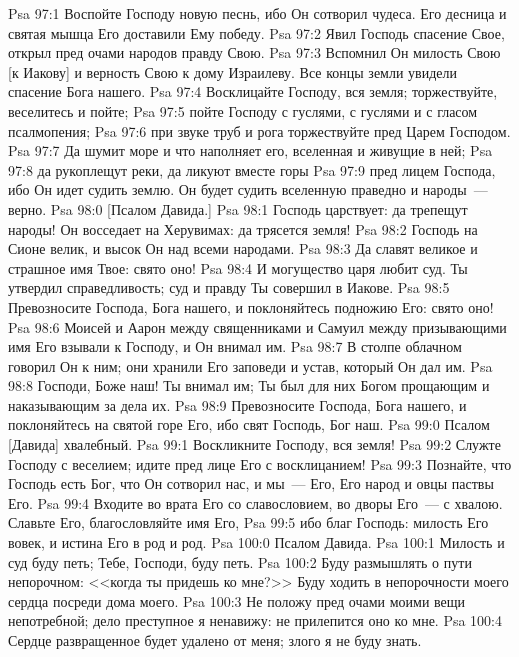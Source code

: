 \rsbpar\vs Psa 97:1 Воспойте Господу новую песнь, ибо Он сотворил чудеса. Его десница и святая мышца Его доставили Ему победу.
\vs Psa 97:2 Явил Господь спасение Свое, открыл пред очами народов правду Свою.
\vs Psa 97:3 Вспомнил Он милость Свою [к Иакову] и верность Свою к дому Израилеву. Все концы земли увидели спасение Бога нашего.
\vs Psa 97:4 Восклицайте Господу, вся земля; торжествуйте, веселитесь и пойте;
\vs Psa 97:5 пойте Господу с гуслями, с гуслями и с гласом псалмопения;
\vs Psa 97:6 при звуке труб и рога торжествуйте пред Царем Господом.
\vs Psa 97:7 Да шумит море и что наполняет его, вселенная и живущие в ней;
\vs Psa 97:8 да рукоплещут реки, да ликуют вместе горы
\vs Psa 97:9 пред лицем Господа, ибо Он идет судить землю. Он будет судить вселенную праведно и народы~--- верно.
\vs Psa 98:0 [Псалом Давида.]
\rsbpar\vs Psa 98:1 Господь царствует: да трепещут народы! Он восседает на Херувимах: да трясется земля!
\vs Psa 98:2 Господь на Сионе велик, и высок Он над всеми народами.
\vs Psa 98:3 Да славят великое и страшное имя Твое: свято оно!
\vs Psa 98:4 И могущество царя любит суд. Ты утвердил справедливость; суд и правду Ты совершил в Иакове.
\vs Psa 98:5 Превозносите Господа, Бога нашего, и поклоняйтесь подножию Его: свято оно!
\vs Psa 98:6 Моисей и Аарон между священниками и Самуил между призывающими имя Его взывали к Господу, и Он внимал им.
\vs Psa 98:7 В столпе облачном говорил Он к ним; они хранили Его заповеди и устав, который Он дал им.
\vs Psa 98:8 Господи, Боже наш! Ты внимал им; Ты был для них Богом прощающим и наказывающим за дела их.
\vs Psa 98:9 Превозносите Господа, Бога нашего, и поклоняйтесь на святой горе Его, ибо свят Господь, Бог наш.
\vs Psa 99:0 Псалом [Давида] хвалебный.
\rsbpar\vs Psa 99:1 Воскликните Господу, вся земля!
\vs Psa 99:2 Слу\-ж\-те Господу с веселием; идите пред лице Его с восклицанием!
\vs Psa 99:3 Познайте, что Господь есть Бог, что Он сотворил нас, и мы~--- Его, Его народ и овцы паствы Его.
\vs Psa 99:4 Входите во врата Его со славословием, во дворы Его~--- с хвалою. Славьте Его, благословляйте имя Его,
\vs Psa 99:5 ибо благ Господь: милость Его вовек, и истина Его в род и род.
\vs Psa 100:0 Псалом Давида.
\rsbpar\vs Psa 100:1 Милость и суд буду петь; Тебе, Господи, буду петь.
\vs Psa 100:2 Буду размышлять о пути непорочном: <<когда ты придешь ко мне?>> Буду ходить в непорочности моего сердца посреди дома моего.
\vs Psa 100:3 Не положу пред очами моими вещи непотребной; дело преступное я ненавижу: не прилепится оно ко мне.
\vs Psa 100:4 Сердце развращенное будет удалено от меня; злого я не буду знать.
